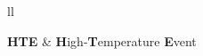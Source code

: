 \documentclass[
12pt, %
english, %
singlespacing, %
headsepline, %
]{MastersThesis} %
\begin{document}

\tableofcontents %

\listoffigures

\listoftables


\begin{abbreviations}{ll} %

\begin{table}[!ht]
\begin{tabular}
\textbf{HTE} & \textbf{H}igh-\textbf{T}emperature \textbf{E}vent \\
\end{tabular}
\end{table}

\end{abbreviations}




\mainmatter %
\end{document}
